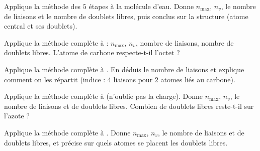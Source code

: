 \documentclass[11pt,a4paper]{article}
\begin{document}
\begin{exo}[l'eau \ce{H2O}]
Applique la méthode des $5$ étapes à la molécule d'eau. Donne $n_{\max}$, $n_v$, le nombre de
liaisons et le nombre de doublets libres, puis conclus sur la structure (atome central et ses
doublets).
\end{exo}

\begin{exo}[le méthane \ce{CH4}]
Applique la méthode complète à  : $n_{\max}$, $n_v$, nombre de liaisons, nombre de
doublets libres. L'atome de carbone respecte-t-il l'octet ?
\end{exo}

\begin{exo}
Applique la méthode complète à . En déduis le nombre de liaisons et explique comment on
les répartit (indice : $4$ liaisons pour $2$ atomes  liés au carbone).
\end{exo}

\begin{exo}
Applique la méthode complète à  (n'oublie pas la charge). Donne $n_{\max}$, $n_v$, le
nombre de liaisons et de doublets libres. Combien de doublets libres reste-t-il sur l'azote ?
\end{exo}

\begin{exo}
Applique la méthode complète à . Donne $n_{\max}$, $n_v$, le nombre de liaisons et de
doublets libres, et précise sur quels atomes se placent les doublets libres.
\end{exo}
\end{document}
